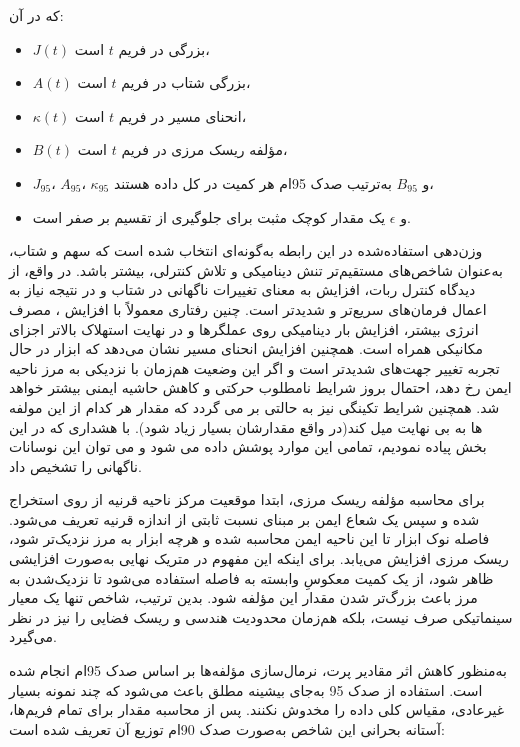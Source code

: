 \documentclass{article}
\begin{document}
که در آن:
\begin{itemize}
	\item $J(t)$ بزرگی  در فریم $t$ است،
	\item $A(t)$ بزرگی شتاب در فریم $t$ است،
	\item $\kappa(t)$ انحنای مسیر در فریم $t$ است،
	\item $B(t)$ مؤلفه ریسک مرزی در فریم $t$ است،
	\item $J_{95}$، $A_{95}$، $\kappa_{95}$ و $B_{95}$ به‌ترتیب صدک 95ام هر کمیت در کل داده هستند،
	\item و $\epsilon$ یک مقدار کوچک مثبت برای جلوگیری از تقسیم بر صفر است.
\end{itemize}

وزن‌دهی استفاده‌شده در این رابطه به‌گونه‌ای انتخاب شده است که سهم  و شتاب، به‌عنوان شاخص‌های مستقیم‌تر تنش دینامیکی و تلاش کنترلی، بیشتر باشد. در واقع، از دیدگاه کنترل ربات، افزایش  به معنای تغییرات ناگهانی در شتاب و در نتیجه نیاز به اعمال فرمان‌های سریع‌تر و شدیدتر است. چنین رفتاری معمولاً با افزایش ، مصرف انرژی بیشتر، افزایش بار دینامیکی روی عملگرها و در نهایت استهلاک بالاتر اجزای مکانیکی همراه است. همچنین افزایش انحنای مسیر نشان می‌دهد که ابزار در حال تجربه تغییر جهت‌های شدیدتر است و اگر این وضعیت هم‌زمان با نزدیکی به مرز ناحیه ایمن رخ دهد، احتمال بروز شرایط نامطلوب حرکتی و کاهش حاشیه ایمنی بیشتر خواهد شد. همچنین شرایط تکینگی نیز به حالتی بر می گردد که مقدار هر کدام از این مولفه ها به بی نهایت میل کند(در واقع مقدارشان بسیار زیاد شود). با هشداری که در این بخش پیاده نمودیم، تمامی این موارد پوشش داده می شود و می توان این نوسانات ناگهانی را تشخیص داد.

برای محاسبه مؤلفه ریسک مرزی، ابتدا موقعیت مرکز ناحیه قرنیه از روی  استخراج شده و سپس یک شعاع ایمن بر مبنای نسبت ثابتی از اندازه قرنیه تعریف می‌شود. فاصله نوک ابزار تا این ناحیه ایمن محاسبه شده و هرچه ابزار به مرز نزدیک‌تر شود، ریسک مرزی افزایش می‌یابد. برای اینکه این مفهوم در متریک نهایی به‌صورت افزایشی ظاهر شود، از یک کمیت معکوسِ وابسته به فاصله استفاده می‌شود تا نزدیک‌شدن به مرز باعث بزرگ‌تر شدن مقدار این مؤلفه شود. بدین ترتیب، شاخص  تنها یک معیار سینماتیکی صرف نیست، بلکه هم‌زمان محدودیت هندسی و ریسک فضایی را نیز در نظر می‌گیرد.

به‌منظور کاهش اثر مقادیر پرت، نرمال‌سازی مؤلفه‌ها بر اساس صدک 95ام انجام شده است. استفاده از صدک 95 به‌جای بیشینه مطلق باعث می‌شود که چند نمونه بسیار غیرعادی، مقیاس کلی داده را مخدوش نکنند. پس از محاسبه مقدار  برای تمام فریم‌ها، آستانه بحرانی این شاخص به‌صورت صدک 90ام توزیع آن تعریف شده است:
\end{document}
